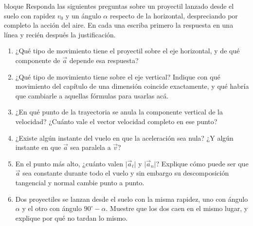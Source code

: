 \documentclass[11pt,openany]{book}
\begin{document}
\begin{ejercicio}{bloque}
Responda las siguientes preguntas sobre un proyectil lanzado desde el suelo con rapidez $v_0$ y un ángulo $\alpha$ respecto de la horizontal, despreciando por completo la acción del aire. En cada una escriba primero la respuesta en una línea y recién después la justificación.
\begin{enumerate}[label=(\alph*), leftmargin=1.7em, itemsep=1pt, topsep=3pt]
  \item ¿Qué tipo de movimiento tiene el proyectil sobre el eje horizontal, y de qué componente de $\vec a$ depende esa respuesta?
  \item ¿Qué tipo de movimiento tiene sobre el eje vertical? Indique con qué movimiento del capítulo de una dimensión coincide exactamente, y qué habría que cambiarle a aquellas fórmulas para usarlas acá.
  \item ¿En qué punto de la trayectoria se anula la componente vertical de la velocidad? ¿Cuánto vale el vector velocidad completo en ese punto?
  \item ¿Existe algún instante del vuelo en que la aceleración sea nula? ¿Y algún instante en que $\vec a$ sea paralela a $\vec v$?
  \item En el punto más alto, ¿cuánto valen $\lvert\vec a_t\rvert$ y $\lvert\vec a_n\rvert$? Explique cómo puede ser que $\vec a$ sea constante durante todo el vuelo y sin embargo su descomposición tangencial y normal cambie punto a punto.
  \item Dos proyectiles se lanzan desde el suelo con la misma rapidez, uno con ángulo $\alpha$ y el otro con ángulo $90^\circ - \alpha$. Muestre que los dos caen en el mismo lugar, y explique por qué no tardan lo mismo.
\end{enumerate}
\end{ejercicio}
\end{document}

